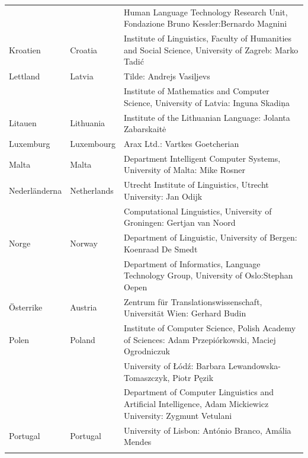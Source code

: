 \begin{longtable}{llp{113mm}}
  & & Human Language Technology Research Unit, Fondazione Bruno Kessler:\newline Bernardo Magnini\\ \addlinespace 
  Kroatien & \textcolor{grey1}{Croatia} & Institute of Linguistics, Faculty of Humanities and Social Science, University of Zagreb: Marko Tadić \\ \addlinespace
  Lettland & \textcolor{grey1}{Latvia} & Tilde: Andrejs Vasiļjevs\\ \addlinespace 
  & & Institute of Mathematics and Computer Science, University of Latvia: Inguna Skadiņa\\ \addlinespace
  Litauen & \textcolor{grey1}{Lithuania} & Institute of the Lithuanian Language: Jolanta Zabarskaitė\\ \addlinespace
  Luxemburg & \textcolor{grey1}{Luxembourg} & Arax Ltd.: Vartkes Goetcherian\\ \addlinespace
  Malta & \textcolor{grey1}{Malta} & Department Intelligent Computer Systems, University of Malta: Mike Rosner\\ \addlinespace
  Nederländerna & \textcolor{grey1}{Netherlands} & Utrecht Institute of Linguistics, Utrecht University: Jan Odijk\\ \addlinespace 
  & & Computational Linguistics, University of Groningen: Gertjan van Noord\\ \addlinespace
  Norge & \textcolor{grey1}{Norway} & Department of Linguistic, University of Bergen: Koenraad De Smedt\\ \addlinespace 
  & & Department of Informatics, Language Technology Group, University of Oslo:\newline Stephan Oepen \\ \addlinespace
  Österrike  & \textcolor{grey1}{Austria} & Zentrum für Translationswissenschaft, Universität Wien: Gerhard Budin\\ \addlinespace 
  Polen & \textcolor{grey1}{Poland} & Institute of Computer Science, Polish Academy of Sciences: Adam Przepiórkowski, Maciej Ogrodniczuk \\ \addlinespace
  & & University of Łódź: Barbara Lewandowska-Tomaszczyk, Piotr Pęzik\\ \addlinespace
  & & Department of Computer Linguistics and Artificial Intelligence, Adam Mickiewicz University: Zygmunt Vetulani \\ \addlinespace
  Portugal & \textcolor{grey1}{Portugal} & University of Lisbon: António Branco, Amália Mendes \\ \addlinespace

\end{longtable}
